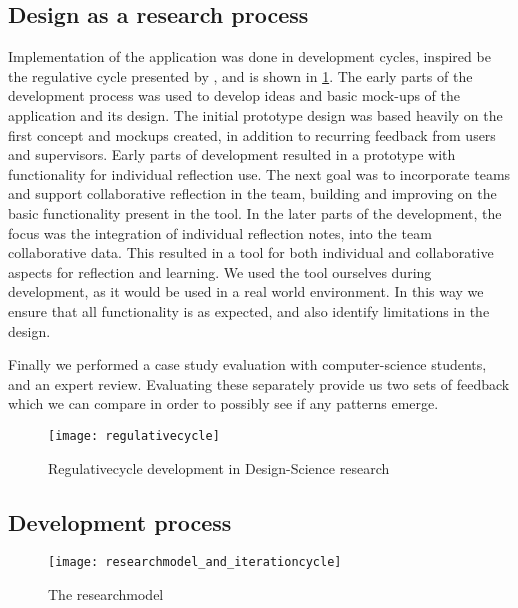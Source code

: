 \subsection{Design as a research process}
Implementation of the application was done in development cycles, inspired be the regulative cycle presented by \cite{wieringa}, and is shown in \ref{regulativecycle}. 
The early parts of the development process was used to develop ideas and basic mock-ups of the application and its design. The initial prototype design was based heavily on the first concept and mockups created, in addition to recurring feedback from users and supervisors. Early parts of development resulted in a prototype with functionality for individual reflection use. The next goal was to incorporate teams and support collaborative reflection in the team, building and improving on the basic functionality present in the tool. In the later parts of the development, the focus was the integration of individual reflection notes, into the team collaborative data. This resulted in a tool for both individual and collaborative aspects for reflection and learning. We used the tool ourselves during development, as it would be used in a real world environment. In this way we ensure that all functionality is as expected, and also identify limitations in the design. 

Finally we performed a case study evaluation with computer-science students, and an expert review. Evaluating these separately provide us two sets of feedback which we can compare in order to possibly see if any patterns emerge. 
\begin{figure}[!htpb]
\label{regulativecycle}
\centering
	\texttt{[image: regulativecycle]}
\caption{Regulativecycle development in Design-Science research}
\end{figure}

\subsection{Development process}
\begin{figure}[!htpb]
\label{researchmodel}
\centering
	\texttt{[image: researchmodel\_and\_iterationcycle]}
\caption{The researchmodel}
\end{figure}


